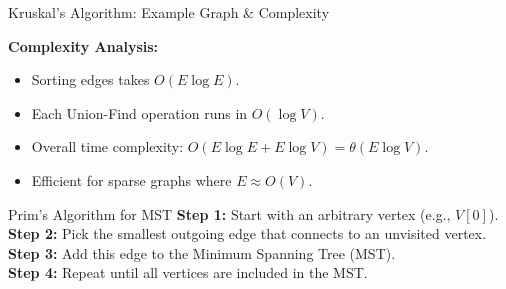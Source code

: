 \begin{frame}{Kruskal’s Algorithm: Example Graph \& Complexity} %
    \centering

    \vspace{0.5cm}
    \textbf{Complexity Analysis:}
    \begin{itemize}
        \item Sorting edges takes \( O(E \log E) \).
        \item Each Union-Find operation runs in \( O(\log V) \).
        \item Overall time complexity: \( O(E \log E + E \log V) = \theta(E \log V) \).
        \item Efficient for sparse graphs where \( E \approx O(V) \).
    \end{itemize}
\end{frame}



\begin{frame}{Prim’s Algorithm for MST}
    \textbf{Step 1:} Start with an arbitrary vertex (e.g., \( V[0] \)). \\
    \textbf{Step 2:} Pick the smallest outgoing edge that connects to an unvisited vertex. \\
    \textbf{Step 3:} Add this edge to the Minimum Spanning Tree (MST). \\
    \textbf{Step 4:} Repeat until all vertices are included in the MST. \\
\end{frame}


